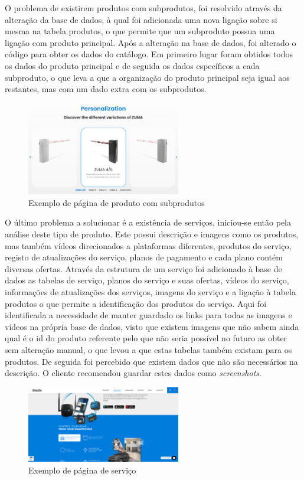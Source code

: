 O problema de existirem produtos com subprodutos, foi resolvido através da alteração da base de dados, à qual foi adicionada uma nova ligação sobre si mesma na tabela produtos, o que permite que um subproduto possua uma ligação com produto principal. Após a alteração na base de dados, foi alterado o código para obter os dados do catálogo. Em primeiro lugar foram obtidos todos os dados do produto principal e de seguida os dados específicos a cada subproduto, o que leva a que a organização do produto principal seja igual aos restantes, mas com um dado extra com os subprodutos. 

\begin{figure}[htb]
    \centering
    \includegraphics[width=0.6\textwidth]{images/implementacao/scraper/zuma.png}
    \caption{Exemplo de página de produto com subprodutos}
    \label{fig:61}
\end{figure}

\newpage

O último problema a solucionar é a existência de serviços, iniciou-se então pela análise deste tipo de produto. Este possui descrição e imagens como os produtos, mas também vídeos direcionados a plataformas diferentes, produtos do serviço, registo de atualizações do serviço, planos de pagamento e cada plano contém diversas ofertas. 
Através da estrutura de um serviço foi adicionado à base de dados as tabelas de serviço, planos do serviço e suas ofertas, vídeos do serviço, informações de atualizações dos serviços, imagens do serviço e a ligação à tabela produtos o que permite a identificação dos produtos do serviço. Aqui  foi identificada a necessidade de manter guardado os links para todas as imagens e vídeos na própria base de dados, visto que existem imagens que não sabem ainda qual é o id do produto referente pelo que não seria possível no futuro as obter sem alteração manual, o que levou a que estas tabelas também existam para os produtos.
De seguida foi percebido que existem dados que não são necessários na descrição. O cliente recomendou guardar estes dados como \textit{screenshots}.
\begin{figure}[htb]
    \centering
    \includegraphics[width=0.6\textwidth]{images/implementacao/scraper/mconnect.png}
    \caption{Exemplo de página de serviço}
    \label{fig:62}
\end{figure}

